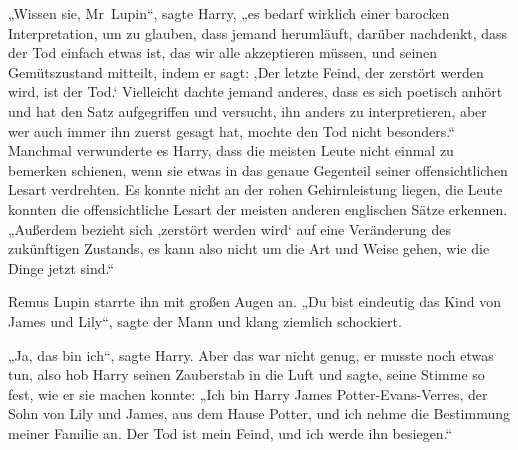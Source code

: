 „Wissen sie, Mr~Lupin“, sagte Harry, „es bedarf wirklich einer barocken Interpretation, um zu glauben, dass jemand herumläuft, darüber nachdenkt, dass der Tod einfach etwas ist, das wir alle akzeptieren müssen, und seinen Gemütszustand mitteilt, indem er sagt: ‚Der letzte Feind, der zerstört werden wird, ist der Tod.‘ Vielleicht dachte jemand anderes, dass es sich poetisch anhört und hat den Satz aufgegriffen und versucht, ihn anders zu interpretieren, aber wer auch immer ihn zuerst gesagt hat, mochte den Tod nicht besonders.“ Manchmal verwunderte es Harry, dass die meisten Leute nicht einmal zu bemerken schienen, wenn sie etwas in das genaue Gegenteil seiner offensichtlichen Lesart verdrehten. Es konnte nicht an der rohen Gehirnleistung liegen, die Leute konnten die offensichtliche Lesart der meisten anderen englischen Sätze erkennen.
„Außerdem bezieht sich ‚zerstört werden wird‘ auf eine Veränderung des zukünftigen Zustands, es kann also nicht um die Art und Weise gehen, wie die Dinge jetzt sind.“

Remus Lupin starrte ihn mit großen Augen an.
„Du bist eindeutig das Kind von James und Lily“, sagte der Mann und klang ziemlich schockiert.

„Ja, das bin ich“, sagte Harry. Aber das war nicht genug, er musste noch etwas tun, also hob Harry seinen Zauberstab in die Luft und sagte, seine Stimme so fest, wie er sie machen konnte:
„Ich bin Harry James Potter-Evans-Verres, der Sohn von Lily und James, aus dem Hause Potter, und ich nehme die Bestimmung meiner Familie an. Der Tod ist mein Feind, und ich werde ihn besiegen.“

